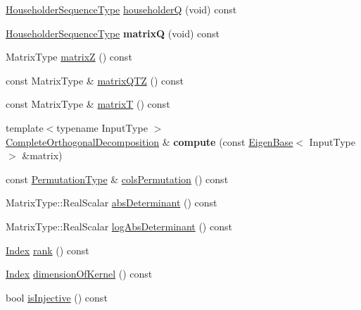 \begin{DoxyCompactItemize}
\item 
\hyperlink{group___householder___module_class_eigen_1_1_householder_sequence}{Householder\+Sequence\+Type} \hyperlink{group___q_r___module_ac95b93ddad59c6e57d06fcd4737b27e1}{householderQ} (void) const
\item 
\mbox{\label{group___q_r___module_a179e996df71ef165bad8f4bc5d79e24d}} 
\hyperlink{group___householder___module_class_eigen_1_1_householder_sequence}{Householder\+Sequence\+Type} {\bfseries matrixQ} (void) const
\item 
Matrix\+Type \hyperlink{group___q_r___module_a4cd178f13aefe5189d4beeb3eb1c5897}{matrixZ} () const
\item 
const Matrix\+Type \& \hyperlink{group___q_r___module_ad89e2529fc1a8721239d9b6be9613a69}{matrix\+Q\+TZ} () const
\item 
const Matrix\+Type \& \hyperlink{group___q_r___module_a806213f5c96ff765265f47067229586d}{matrixT} () const
\item 
\mbox{\label{group___q_r___module_a28aa1e99ac0116246c66608f3fd10d31}} 
{\footnotesize template$<$typename Input\+Type $>$ }\\\hyperlink{group___q_r___module_class_eigen_1_1_complete_orthogonal_decomposition}{Complete\+Orthogonal\+Decomposition} \& {\bfseries compute} (const \hyperlink{group___core___module_struct_eigen_1_1_eigen_base}{Eigen\+Base}$<$ Input\+Type $>$ \&matrix)
\item 
const \hyperlink{group___core___module}{Permutation\+Type} \& \hyperlink{group___q_r___module_a601c67a4a0bbe9c7b25b885279db9ff2}{cols\+Permutation} () const
\item 
Matrix\+Type\+::\+Real\+Scalar \hyperlink{group___q_r___module_ac040c34ce3fb2b68d3f57adc0c29d526}{abs\+Determinant} () const
\item 
Matrix\+Type\+::\+Real\+Scalar \hyperlink{group___q_r___module_ad59d6dc78dab52a0038ac372b4a72c0d}{log\+Abs\+Determinant} () const
\item 
\hyperlink{namespace_eigen_a62e77e0933482dafde8fe197d9a2cfde}{Index} \hyperlink{group___q_r___module_af348f64b26f8467a020062c22b748806}{rank} () const
\item 
\hyperlink{namespace_eigen_a62e77e0933482dafde8fe197d9a2cfde}{Index} \hyperlink{group___q_r___module_aca2b59560c4851b7d7701872990a3426}{dimension\+Of\+Kernel} () const
\item 
bool \hyperlink{group___q_r___module_a2740067b81ec3e0ad20a2bea9a5a475f}{is\+Injective} () const

\end{DoxyCompactItemize}
